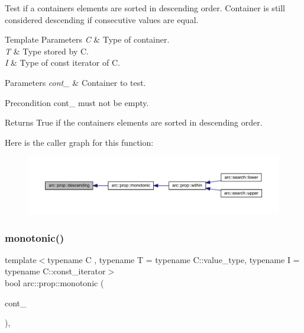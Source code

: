 Test if a container\textquotesingle{}s elements are sorted in descending order. Container is still considered descending if consecutive values are equal.


\begin{DoxyTemplParams}{Template Parameters}
{\em C} & Type of container. \\
\hline
{\em T} & Type stored by C. \\
\hline
{\em I} & Type of const iterator of C.\\
\hline
\end{DoxyTemplParams}

\begin{DoxyParams}{Parameters}
{\em cont\+\_\+} & Container to test.\\
\hline
\end{DoxyParams}
\begin{DoxyPrecond}{Precondition}
cont\+\_\+ must not be empty.
\end{DoxyPrecond}
\begin{DoxyReturn}{Returns}
True if the container\textquotesingle{}s elements are sorted in descending order. 
\end{DoxyReturn}
Here is the caller graph for this function\+:\nopagebreak
\begin{figure}[H]
\begin{center}
\leavevmode
\includegraphics[width=350pt]{namespacearc_1_1prop_a156186f9684c79f4f28bb793af35f0bd_icgraph}
\end{center}
\end{figure}
\mbox{\label{namespacearc_1_1prop_a0b6cfeae4fa16eddbb6b7f1e9c355258}} 
\subsubsection{\texorpdfstring{monotonic()}{monotonic()}}
{\footnotesize\ttfamily template$<$typename C , typename T  = typename C\+::value\+\_\+type, typename I  = typename C\+::const\+\_\+iterator$>$ \\
bool arc\+::prop\+::monotonic (\begin{DoxyParamCaption}\item[{const C \&}]{cont\+\_\+ }\end{DoxyParamCaption})\hspace{0.3cm}{\ttfamily [inline]}, {\ttfamily [noexcept]}}

